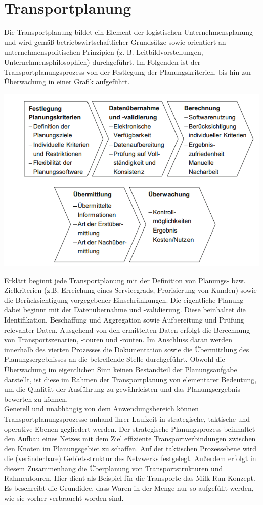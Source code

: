 \documentclass[a4paper,12pt]{scrreprt}
\begin{document}
	\chapter{Transportplanung}
	
	Die Transportplanung bildet ein Element der logistischen Unternehmensplanung und wird gemäß betriebswirtschaftlicher Grundsätze sowie orientiert an unternehmenspolitischen Prinzipien (z. B. Leitbildvorstellungen, Unternehmensphilosophien) durchgeführt. Im Folgenden ist der Transportplanungsprozess von der Festlegung der Planungskriterien, bis hin zur Überwachung in einer Grafik aufgeführt.
	\begin{center}
	\includegraphics[width=0.7\linewidth]{./Bilder/Transportplanungsprozess}
	\end{center}
	Erklärt beginnt jede Transportplanung mit der Definition von Planungs- bzw. Zielkriterien (z.B. Erreichung eines Servicegrads, Prorisierung von Kunden) sowie die Berücksichtigung vorgegebener Einschränkungen. Die eigentliche Planung dabei beginnt mit der Datenübernahme und -validierung. Diese beinhaltet die Identifikation, Beschaffung und Aggregation sowie Aufbereitung und Prüfung relevanter Daten. Ausgehend von den ermittelten Daten erfolgt die Berechnung von Transportszenarien, -touren und -routen. Im Anschluss daran werden innerhalb des vierten Prozesses die Dokumentation sowie die Übermittlung des Planungsergebnisses an die betreffende Stelle durchgeführt. Obwohl die Überwachung im eigentlichen Sinn keinen Bestandteil der Planungsaufgabe darstellt, ist diese im Rahmen der Transportplanung von elementarer Bedeutung, um die Qualität der Ausführung zu gewährleisten und das Planungsergebnis bewerten zu können.\\
	
	Generell und unabhängig von dem Anwendungsbereich können Transportplanungsprozesse anhand ihrer Laufzeit in strategische, taktische und operative Ebenen gegliedert werden. Der strategische Planungsprozess beinhaltet den Aufbau eines Netzes mit dem Ziel effiziente Transportverbindungen zwischen den Knoten im Planungsgebiet zu schaffen. Auf der taktischen Prozessebene wird die (veränderbare) Gebietsstruktur des Netzwerks festgelegt. Außerdem erfolgt in diesem Zusammenhang die Überplanung von Transportstrukturen und Rahmentouren. Hier dient als Beispiel für die Transporte das Milk-Run Konzept. Es beschreibt die Grundidee, dass Waren in der Menge nur so aufgefüllt werden, wie sie vorher verbraucht worden sind.\\
	
\end{document}
